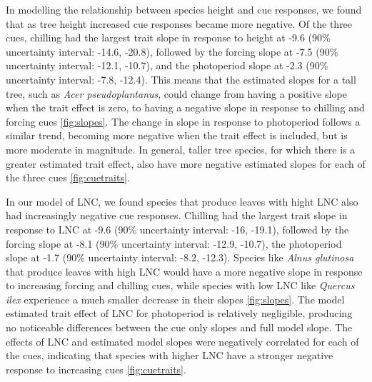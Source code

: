 \documentclass{article}\usepackage[]{graphicx}\usepackage[]{color}
\begin{document}
In modelling the relationship between species height and cue responses, we found that as tree height increased cue responses became more negative. Of the three cues, chilling had the largest trait slope in response to height at -9.6 (90\% uncertainty interval: -14.6, -20.8), followed by the forcing slope at -7.5 (90\% uncertainty interval: -12.1, -10.7), and the photoperiod slope at -2.3 (90\% uncertainty interval: -7.8, -12.4). This means that the estimated slopes for a tall tree, such as \textit{Acer pseudoplantanus}, could change from having a positive slope when the trait effect is zero, to having a negative slope in response to chilling and forcing cues \ref{fig:slopes}. The change in slope in response to photoperiod follows a similar trend, becoming more negative when the trait effect is included, but is more moderate in magnitude. In general, taller tree species, for which there is a greater estimated trait effect,  also have more negative estimated slopes for each of the three cues \ref{fig:cuetraits}. 

In our model of LNC, we found species that produce leaves with hight LNC also had increasingly negative cue responses. Chilling had the largest trait slope in response to LNC at -9.6 (90\% uncertainty interval: -16, -19.1), followed by the forcing slope at -8.1 (90\% uncertainty interval: -12.9, -10.7), the photoperiod slope at -1.7 (90\% uncertainty interval: -8.2, -12.3). Species like \textit{Alnus glutinosa} that produce leaves with high LNC would have a more negative slope in response to increasing forcing and chilling cues, while species with low LNC like \textit{Quercus ilex} experience a much smaller decrease in their slopes \ref{fig:slopes}. The model estimated trait effect of LNC for photoperiod is relatively negligible, producing no noticeable differences between the cue only slopes and full model slope.  The effects of LNC and estimated model slopes were negatively correlated for each of the cues, indicating that species with higher LNC have a stronger negative response to increasing cues \ref{fig:cuetraits}. 
\end{document}
